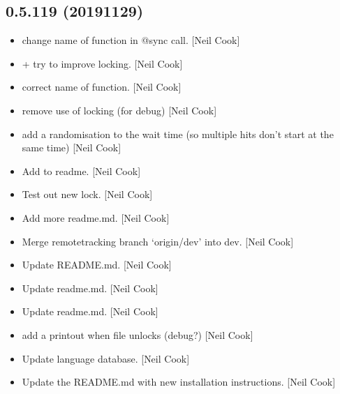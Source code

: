 \documentclass[a4paper,10pt,english]{report}
\begin{document}
\subsection{0.5.119 (2019\sphinxhyphen{}11\sphinxhyphen{}29)}
\label{\detokenize{misc/changelog:id43}}\begin{itemize}
\item {} 
 \sphinxhyphen{} change name of function in @sync call. {[}Neil Cook{]}

\item {} 
 +  \sphinxhyphen{} try to improve locking. {[}Neil Cook{]}

\item {} 
 \sphinxhyphen{} correct name of function. {[}Neil Cook{]}

\item {} 
 \sphinxhyphen{} remove use of locking (for debug) {[}Neil Cook{]}

\item {} 
 \sphinxhyphen{} add a randomisation to the wait time (so multiple
hits don’t start at the same time) {[}Neil Cook{]}

\item {} 
Add to readme. {[}Neil Cook{]}

\item {} 
Test out new lock. {[}Neil Cook{]}

\item {} 
Add more readme.md. {[}Neil Cook{]}

\item {} 
Merge remote\sphinxhyphen{}tracking branch ‘origin/dev’ into dev. {[}Neil Cook{]}

\item {} 
Update README.md. {[}Neil Cook{]}

\item {} 
Update readme.md. {[}Neil Cook{]}

\item {} 
Update readme.md. {[}Neil Cook{]}

\item {} 
 \sphinxhyphen{} add a printout when file unlocks (debug?) {[}Neil Cook{]}

\item {} 
Update language database. {[}Neil Cook{]}

\item {} 
Update the README.md with new installation instructions. {[}Neil Cook{]}


\end{itemize}
\end{document}
